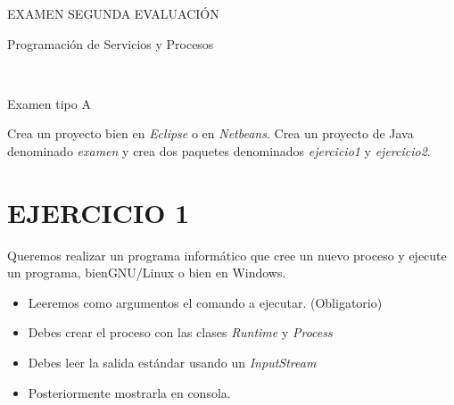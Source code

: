 \documentclass[addpoints]{exam}
\begin{document}
\begin{center}
\begin{Huge}
EXAMEN SEGUNDA EVALUACIÓN
\end{Huge}
\vspace{0.06in}

\begin{huge}
Programación de Servicios y Procesos
\end{huge}\\
\vspace{0.09in}

\begin{LARGE}
Examen tipo A
\end{LARGE}
\vspace{0.1in}

\end{center}
\begin{center}
\end{center}

Crea un proyecto bien en \emph{Eclipse} o en \emph{Netbeans}. Crea un proyecto de Java denominado \emph{examen} y crea dos paquetes denominados \emph{ejercicio1} y \emph{ejercicio2}.
\vspace{0.1in}
\section{EJERCICIO 1}
Queremos realizar un programa informático que cree un nuevo proceso y ejecute un programa, bienGNU/Linux o bien en Windows. \\
\begin{itemize}
\item Leeremos como argumentos el comando a ejecutar. (Obligatorio)
\item Debes crear el proceso con las clases \emph{Runtime} y \emph{Process}
\item Debes leer la salida estándar usando un \emph{InputStream}
\item Posteriormente mostrarla en consola.
\end{itemize}
\end{document}
